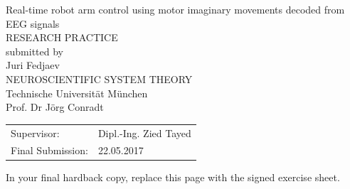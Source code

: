 \documentclass[a4paper,twoside, openright,12pt]{report}
\begin{document}
\pagestyle{empty}
\enlargethispage{4.5cm} %
\begin{center}
\phantom{u}
\vspace{0.5cm}
\Huge{\sc Real-time robot arm control using motor imaginary movements decoded from EEG
	signals}\\
\vspace{1.5cm}
		\large{
			RESEARCH PRACTICE\\%
			\vspace{0.4cm}
			submitted by\\
			Juri Fedjaev\\
			\vspace{1.5cm}
			NEUROSCIENTIFIC SYSTEM THEORY\\
			Technische Universit\"at M\"unchen\\
			\vspace{0.3cm}
			Prof. Dr J\"org Conradt\\
		}
\end{center}
\vspace{5.5cm}
\begin{tabular}{ll}
Supervisor: &Dipl.-Ing. Zied Tayed \\
Final Submission: &  22.05.2017 \\
\end{tabular}

\newpage	
\cleardoublepage



\phantom{u}
\phantom{1}\vspace{6cm}
\begin{center}
In your final hardback copy, replace this page with the signed exercise sheet.
\end{center}
\end{document}

